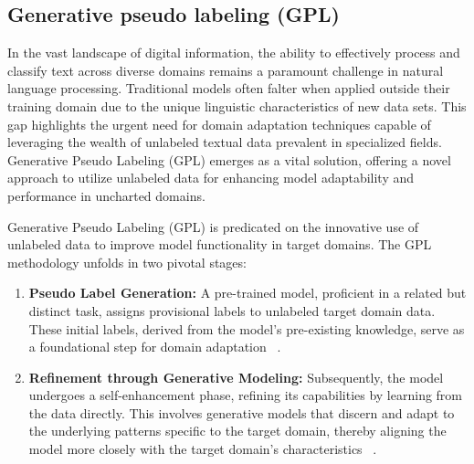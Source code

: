 \documentclass[fleqn,moreauthors,10pt]{ds_report}
\begin{document}
\subsection*{Generative pseudo labeling (GPL)}

In the vast landscape of digital information, the ability to effectively process and classify text across diverse domains remains a paramount challenge in natural language processing. Traditional models often falter when applied outside their training domain due to the unique linguistic characteristics of new data sets. This gap highlights the urgent need for domain adaptation techniques capable of leveraging the wealth of unlabeled textual data prevalent in specialized fields. Generative Pseudo Labeling (GPL) emerges as a vital solution, offering a novel approach to utilize unlabeled data for enhancing model adaptability and performance in uncharted domains.

Generative Pseudo Labeling (GPL) is predicated on the innovative use of unlabeled data to improve model functionality in target domains. The GPL methodology unfolds in two pivotal stages:
\begin{enumerate}
    \item \textbf{Pseudo Label Generation:} A pre-trained model, proficient in a related but distinct task, assigns provisional labels to unlabeled target domain data. These initial labels, derived from the model's pre-existing knowledge, serve as a foundational step for domain adaptation ~\cite{reimers2019sentence}.
    
    \item \textbf{Refinement through Generative Modeling:} Subsequently, the model undergoes a self-enhancement phase, refining its capabilities by learning from the data directly. This involves generative models that discern and adapt to the underlying patterns specific to the target domain, thereby aligning the model more closely with the target domain's characteristics ~\cite{wang-etal-2022-gpl}.
\end{enumerate}
\end{document}
